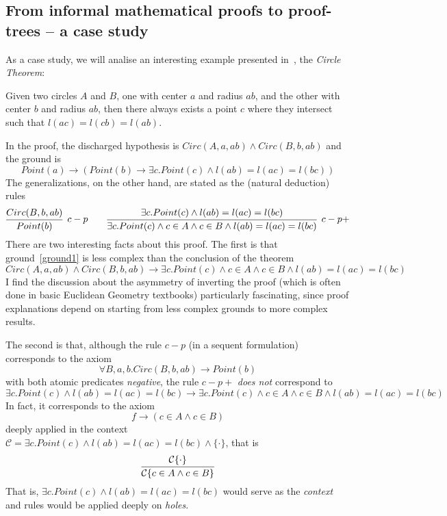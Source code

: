 \documentclass{llncs}
\begin{document}
\subsection{From informal mathematical proofs to proof-trees -- a case study}
As a case study, we will analise an interesting example presented in~\cite{francesca}, the {\em Circle Theorem}:

\begin{theorem} Given two circles $A$ and $B$, one with center $a$ and radius $ab$, and the other with center $b$ and radius $ab$, then there always exists a point $c$ where they intersect such that $l(ac) = l(cb) = l(ab)$.
\end{theorem}
In the proof, the discharged hypothesis is $Circ(A, a, ab) \wedge Circ(B, b, ab)$ and the ground is 
\begin{equation}\label{ground1}
Point(a) \to (Point(b) \to\exists c. Point(c) \wedge l(ab) = l(ac) = l(bc))
\end{equation}%
The generalizations, on the other hand, are stated as the (natural deduction) rules
\[
\infer[c-p]{Point(b)}{Circ(B,b,ab)} \qquad
\infer[c-p+]{\exists c. Point(c) \wedge c\in A\wedge c\in B\wedge l(ab) = l(ac) = l(bc)}{\exists c. Point(c) \wedge l(ab) = l(ac) = l(bc)}
\]
There are two interesting facts about this proof. The first is that ground~\ref{ground1} is less complex than the conclusion of the theorem
\[
Circ(A, a, ab) \wedge Circ(B, b, ab)\to\exists c.Point(c)\wedge c\in A\wedge c\in B\wedge l(ab)=l(ac)=l(bc)
\]
I find the discussion about the asymmetry of inverting the proof (which is often done in basic Euclidean Geometry textbooks) particularly fascinating, since proof explanations depend on starting from less complex grounds to more complex results.

The second is that, although the rule $c-p$ (in a sequent formulation) corresponds to the axiom 
\[\forall B,a,b.Circ(B,b,ab)\to Point(b)\]
with both atomic predicates {\em negative}, the rule $c-p+$ {\em does not} correspond to 
\[
\exists c. Point(c) \wedge l(ab) = l(ac) = l(bc) \to \exists c. Point(c) \wedge c\in A\wedge c\in B\wedge l(ab) = l(ac) = l(bc)
\]
In fact, it corresponds to the axiom 
\[
f \to  (c\in A\wedge c\in B)
\] 
deeply applied in the context $\mathcal{C} = \exists c. Point(c) \wedge l(ab) = l(ac) = l(bc)\wedge\{\cdot\}$, that is
\[
\infer{\mathcal{C}\{c\in A\wedge c\in B\}}{\mathcal{C}\{\cdot\}}
\]
That is, $\exists c.Point(c)\wedge l(ab) = l(ac) = l(bc)$ would serve as the {\em context} and rules would be applied deeply on {\em holes}.
\end{document}

